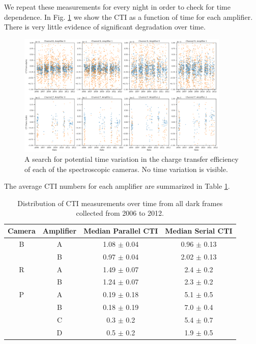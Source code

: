 We repeat these measurements for every night in order to check for time dependence. In Fig. \ref{fig:time_variation} we show the CTI as a function of time for each amplifier. There is very little evidence of significant degradation over time.

\begin{figure}
    \centering
    \includegraphics[width=0.9\textwidth]{figures/chap2/time_variation.png}
    \caption{A search for potential time variation in the charge transfer efficiency of each of the spectroscopic cameras. No time variation is visible.}
    \label{fig:time_variation}
\end{figure}

The average CTI numbers for each amplifier are summarized in Table \ref{tab:cte_darks}.
\begin{table}[h!]
    \centering
    \begin{tabular}{|c|c|c|c|}\hline
        Camera & Amplifier & Median Parallel CTI  & Median Serial CTI \\ \hline
        B & A &   1.08 $\pm$ 0.04  &  0.96 $\pm$ 0.13 \\
          & B &   0.97 $\pm$ 0.04  &  2.02 $\pm$ 0.13 \\\hline
        R & A &   1.49 $\pm$ 0.07  &  2.4  $\pm$ 0.2 \\
          & B &   1.24 $\pm$ 0.07  &  2.3  $\pm$ 0.2 \\\hline
        P & A &   0.19 $\pm$ 0.18  &  5.1  $\pm$ 0.5 \\
          & B &   0.18 $\pm$ 0.19  &  7.0  $\pm$ 0.4 \\
          & C &   0.3  $\pm$ 0.2   &  5.4  $\pm$ 0.7 \\
          & D &   0.5  $\pm$ 0.2   &  1.9  $\pm$ 0.5 \\\hline
    \end{tabular}
    \caption{Distribution of CTI measurements over time from all dark frames collected from 2006 to 2012.}
    \label{tab:cte_darks}
\end{table}

